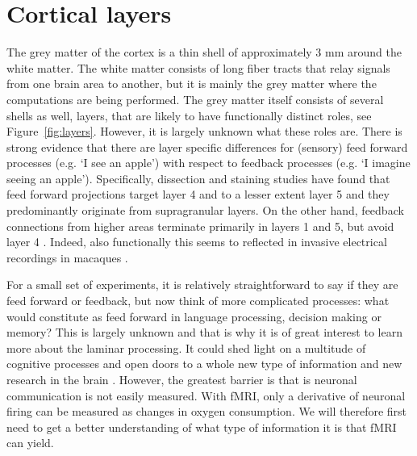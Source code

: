 \section{Cortical layers}
The grey matter of the cortex is a thin shell of approximately 3 mm \cite{Zilles1990} around the white matter. The white matter consists of long fiber tracts that relay signals from one brain area to another, but it is mainly the grey matter where the computations are being performed. The grey matter itself consists of several shells as well, layers, that are likely to have functionally distinct roles, see Figure~\ref{fig:layers}. However, it is largely unknown what these roles are. There is strong evidence that there are layer specific differences for (sensory) feed forward processes (e.g. `I see an apple') with respect to feedback processes (e.g. `I imagine seeing an apple'). Specifically, dissection and staining studies have found that feed forward projections target layer 4 \cite{Felleman1991} and to a lesser extent layer 5 \cite{Constantinople2013} and they predominantly originate from supragranular layers. On the other hand, feedback connections from higher areas terminate primarily in layers 1 and 5, but avoid layer 4 \cite{Felleman1991,Anderson2009}. Indeed, also functionally this seems to reflected in invasive electrical recordings in macaques \cite{Buffalo2011,Maier2010,Maier2011,VanKerkoerle2017}. 


For a small set of experiments, it is relatively straightforward to say if they are feed forward or feedback, but now think of more complicated processes: what would constitute as feed forward in language processing, decision making or memory? This is largely unknown and that is why it is of great interest to learn more about the laminar processing. It could shed light on a multitude of cognitive processes and open doors to a whole new type of information and new research in the brain \cite{Lawrence2017}. However, the greatest barrier is that is neuronal communication is not easily measured. With fMRI, only a derivative of neuronal firing can be measured as changes in oxygen consumption. We will therefore first need to get a better understanding of what type of information it is that fMRI can yield.

